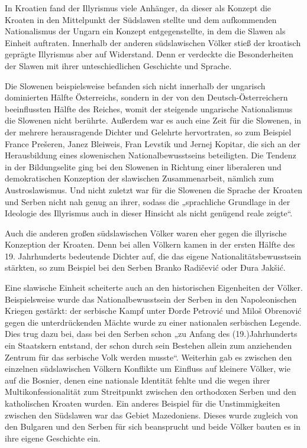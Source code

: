 \documentclass{../../sem_paper}
\begin{document}
In Kroatien fand der Illyrismus viele Anhänger, da dieser als Konzept die Kroaten in den
Mittelpunkt der Südslawen stellte und dem aufkommenden Nationalismus der Ungarn ein
Konzept entgegenstellte, in dem die Slawen als Einheit auftraten.
Innerhalb der anderen südslawischen Völker stieß der kroatisch geprägte Illyrismus aber auf
Widerstand. Denn er verdeckte die Besonderheiten der Slawen mit ihrer unteschiedlichen
Geschichte und Sprache.

Die Slowenen beispielsweise befanden sich nicht innerhalb der ungarisch dominierten Hälfte
Österreichs, sondern in der von den Deutsch-Österreichern beeinflussten Hälfte des Reiches,
womit der steigende ungarische Nationalismus die Slowenen nicht berührte. Außerdem war es
auch eine Zeit für die Slowenen, in der mehrere herausragende Dichter und Gelehrte
hervortraten, so zum Beispiel France Prešeren, Janez Bleiweis, Fran Levstik und Jernej
Kopitar, die sich an der Herausbildung eines slowenischen Nationalbewusstseins beteiligten.
Die Tendenz in der Bildungselite ging bei den Slowenen in Richtung einer liberaleren und
demokratischen Konzeption der slawischen Zusammenarbeit, nämlich zum Austroslawismus.
\autocite[64]{kohn} Und nicht zuletzt war für die Slowenen die Sprache der Kroaten und
Serben nicht nah genug an ihrer, sodass die „sprachliche Grundlage in der Ideologie des
Illyrismus auch in dieser Hinsicht als nicht genügend reale zeigte“\autocite[81]{shidak}.

Auch die anderen großen südslawischen Völker waren eher gegen die illyrische Konzeption
der Kroaten. Denn bei allen Völkern kamen in der ersten Hälfte des 19. Jahrhunderts
bedeutende Dichter auf, die das eigene Nationalitätsbewusstsein stärkten, so zum Beispiel bei
den Serben Branko Radičević oder Đura Jakšić.

Eine slawische Einheit scheiterte auch an den historischen Eigenheiten der Völker.
Beispielsweise wurde das Nationalbewusstsein der Serben in den Napoleonischen Kriegen
gestärkt: der serbische Kampf unter Đorđe Petrović und Miloš Obrenović gegen die
unterdrückenden Mächte wurde zu einer nationalen serbischen Legende. Dies trug dazu bei,
dass bei den Serben schon „zu Anfang des (19.)Jahrhunderts ein Staatskern entstand, der
schon durch sein Bestehen allein zum anziehenden Zentrum für das serbische Volk werden
musste“\autocite[77]{shidak}. Weiterhin gab es zwischen den einzelnen südslawischen Völkern
Konflikte um Einfluss auf kleinere Völker, wie auf die Bosnier, denen eine nationale Identität
fehlte und die wegen ihrer Multikonfessionalität zum Streitpunkt zwischen den orthodoxen
Serben und den katholischen Kroaten wurden. Ein anderes Beispiel für die Unstimmigkeiten
zwischen den Südslawen war das Gebiet Mazedoniens. Dieses wurde zugleich von den
Bulgaren und den Serben für sich beansprucht und beide Völker bauten es in ihre eigene
Geschichte ein.
\end{document}
